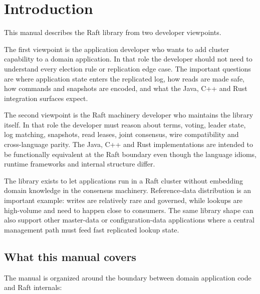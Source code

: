 \section{Introduction}
\label{sec:Introduction}

This manual describes the Raft library from two developer viewpoints.

The first viewpoint is the application developer who wants to add cluster
capability to a domain application. In that role the developer should not need
to understand every election rule or replication edge case. The important
questions are where application state enters the replicated log, how reads are
made safe, how commands and snapshots are encoded, and what the Java, C++ and
Rust integration surfaces expect.

The second viewpoint is the Raft machinery developer who maintains the library
itself. In that role the developer must reason about terms, voting, leader
state, log matching, snapshots, read leases, joint consensus, wire compatibility
and cross-language parity. The Java, C++ and Rust implementations are intended to be
functionally equivalent at the Raft boundary even though the language idioms,
runtime frameworks and internal structure differ.

The library exists to let applications run in a Raft cluster without embedding
domain knowledge in the consensus machinery. Reference-data distribution is an
important example: writes are relatively rare and governed, while lookups are
high-volume and need to happen close to consumers. The same library shape can
also support other master-data or configuration-data applications where a
central management path must feed fast replicated lookup state.

\subsection{What this manual covers}

The manual is organized around the boundary between domain application code and
Raft internals:

